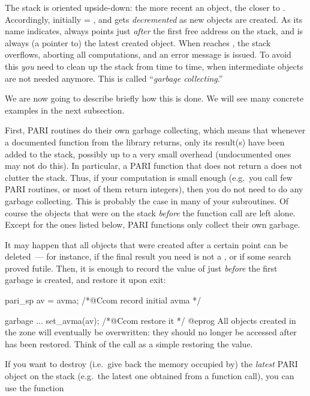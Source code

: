 The stack is oriented upside-down: the more recent an object, the closer to
. Accordingly, initially  = , and  gets
\emph{decremented} as new objects are created. As its name indicates,
 always points just \emph{after} the first free address on the
stack, and  is always (a pointer to) the latest created object.
When  reaches , the stack overflows, aborting all
computations, and an error message is issued. To avoid this \emph{you}
need to clean up the stack from time to time, when intermediate objects are
not needed anymore. This is called ``\emph{garbage collecting}.''

We are now going to describe briefly how this is done. We will see many
concrete examples in the next subsection.

\noindent\item
First, PARI routines do their own garbage collecting, which means that
whenever a documented function from the library returns, only its result(s)
have been added to the stack, possibly up to a very small overhead
(undocumented ones may not do this). In
particular, a PARI function that does not return a  does not clutter
the stack. Thus, if your computation is small enough (e.g.~you call few PARI
routines, or most of them return  integers), then you do not need
to do any garbage collecting. This is probably the case in many of your
subroutines. Of course the objects that were on the stack \emph{before} the
function call are left alone. Except for the ones listed below, PARI
functions only collect their own garbage.

\noindent\item
It may happen that all objects that were created after a certain point can
be deleted~--- for instance, if the final result you need is not a
, or if some search proved futile. Then, it is enough to record
the value of  just \emph{before} the first garbage is created,
and restore it upon exit:

\bprog
pari_sp av = avma; /*@Ccom record initial avma */

garbage ...
set_avma(av); /*@Ccom restore it */
@eprog
\noindent All objects created in the  zone will eventually
be overwritten: they should no longer be accessed after  has been
restored. Think of the  call as a simple 
restoring the  value.

\noindent\item
If you want to destroy (i.e.~give back the memory occupied by) the
\emph{latest} PARI object on the stack (e.g.~the latest one obtained from a
function call), you can use the function%

